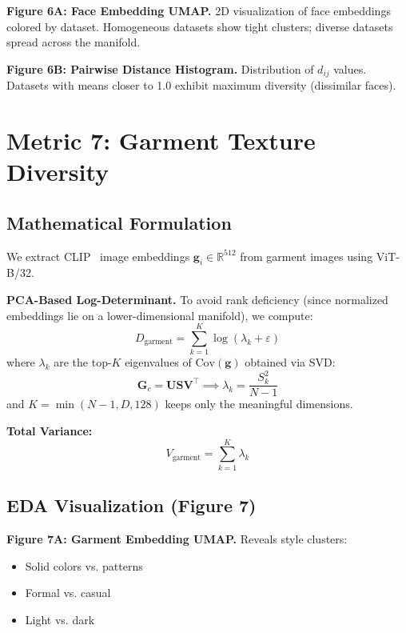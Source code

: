 \documentclass[runningheads]{llncs}
\newcommand{\R}{\mathbb{R}}
\newcommand{\Cov}{\mathrm{Cov}}
\newcommand{\bvec}[1]{\bm{#1}}
\begin{document}
\textbf{Figure 6A: Face Embedding UMAP.} 2D visualization of face embeddings colored by dataset. Homogeneous datasets show tight clusters; diverse datasets spread across the manifold.

\textbf{Figure 6B: Pairwise Distance Histogram.} Distribution of $d_{ij}$ values. Datasets with means closer to 1.0 exhibit maximum diversity (dissimilar faces).


\section{Metric 7: Garment Texture Diversity}
\label{sec:m7_garment}

\subsection{Mathematical Formulation}

We extract CLIP~\cite{radford2021clip} image embeddings $\bvec{g}_i \in \R^{512}$ from garment images using ViT-B/32.

\textbf{PCA-Based Log-Determinant.} To avoid rank deficiency (since normalized embeddings lie on a lower-dimensional manifold), we compute:
\begin{equation}
    D_{\text{garment}} = \sum_{k=1}^{K} \log(\lambda_k + \varepsilon)
\end{equation}
where $\lambda_k$ are the top-$K$ eigenvalues of $\Cov(\bvec{g})$ obtained via SVD:
\begin{equation}
    \bvec{G}_c = \bvec{U}\bvec{S}\bvec{V}^\top \implies \lambda_k = \frac{S_k^2}{N-1}
\end{equation}
and $K = \min(N-1, D, 128)$ keeps only the meaningful dimensions.

\textbf{Total Variance:}
\begin{equation}
    V_{\text{garment}} = \sum_{k=1}^{K} \lambda_k
\end{equation}

\subsection{EDA Visualization (Figure 7)}

\textbf{Figure 7A: Garment Embedding UMAP.} Reveals style clusters:
\begin{itemize}
    \item Solid colors vs. patterns
    \item Formal vs. casual
    \item Light vs. dark
\end{itemize}
\end{document}
